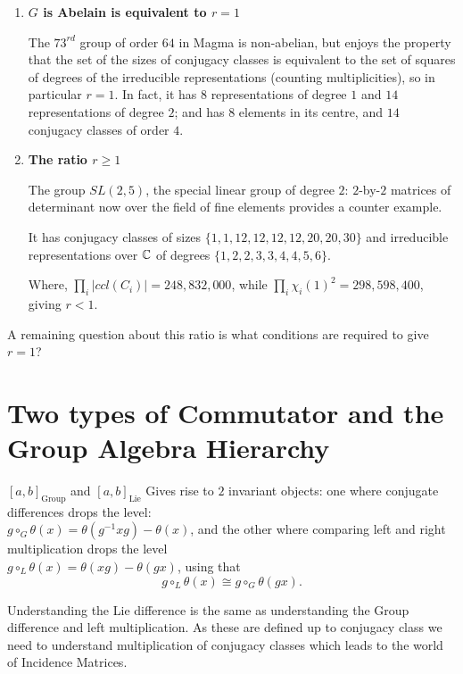 \begin{enumerate}
\item \textbf{$G$ is Abelain is equivalent to $r=1$}

The $73^{rd}$ group of order $64$ in Magma is non-abelian, but enjoys the property that the set of the sizes of conjugacy classes is equivalent to the set of squares of degrees of the irreducible representations (counting multiplicities), so in particular $r=1$. In fact, it has $8$ representations of degree $1$ and $14$ representations of degree $2$; and has $8$ elements in its centre, and $14$ conjugacy classes of order $4$.

\item \textbf{The ratio $r\geq 1$}

The group $SL(2,5)$, the special linear group of degree $2$: $2$-by-$2$ matrices of determinant now over the field of fine elements provides a counter example. 

It has conjugacy classes of sizes $\{ 1,1,12,12,12,12,20,20,30\}$ and irreducible representations over $\mathbb C$ of degrees $\{1,2,2,3,3,4,4,5,6 \}$.

Where, $\prod_i |ccl(C_i)| = 248,832,000$, while $\prod_i \chi_i(1)^2 = 298,598,400$, giving $r<1$.
\end{enumerate}

A remaining question about this ratio is what conditions are required to give $r=1$?




\section{Two types of Commutator and the Group Algebra Hierarchy}

$[a,b]_{\text{Group}}$ and $[a,b]_{\text{Lie}}$
Gives rise to $2$ invariant objects: one where conjugate differences drops the level: \\ $g\circ_{G} \theta (x) = \theta (g^{-1} x g) - \theta (x)$, and the other where comparing left and right multiplication drops the level  \\$g\circ_L \theta (x) = \theta (x g) - \theta (gx)$, using that $$g\circ_L \theta (x) \cong g\circ_G \theta (gx).$$

Understanding the Lie difference is the same as understanding the Group difference and left multiplication. As these are defined up to conjugacy class we need to understand multiplication of conjugacy classes which leads to the world of Incidence Matrices. 

